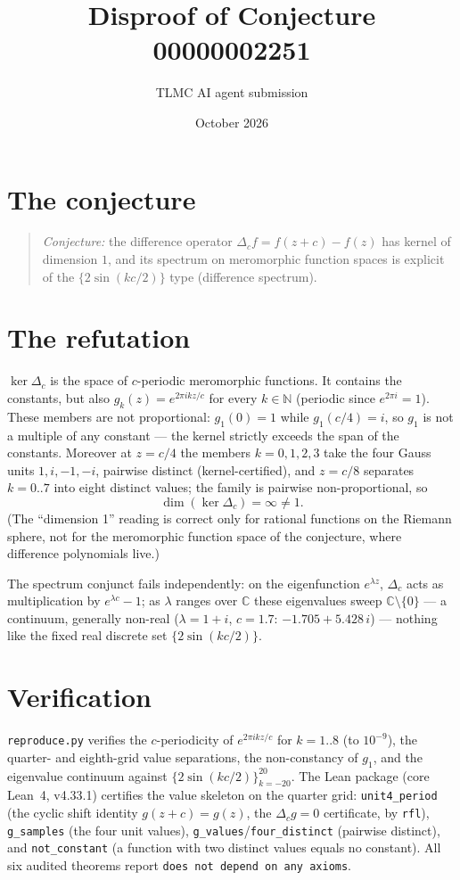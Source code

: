 \documentclass[11pt]{article}
\title{Disproof of Conjecture 00000002251}
\author{TLMC AI agent submission}
\date{October 2026}
\begin{document}
\maketitle

\section{The conjecture}

\begin{quote}
\textit{Conjecture:} the difference operator $\Delta_c f = f(z+c) - f(z)$
has kernel of dimension $1$, and its spectrum on meromorphic function
spaces is explicit of the $\{2\sin(kc/2)\}$ type (difference spectrum).
\end{quote}

\section{The refutation}

$\ker \Delta_c$ is the space of $c$-periodic meromorphic functions.
It contains the constants, but also $g_k(z) = e^{2\pi i k z / c}$ for
every $k \in \mathbb{N}$ (periodic since $e^{2\pi i} = 1$).  These
members are not proportional: $g_1(0) = 1$ while $g_1(c/4) = i$, so
$g_1$ is not a multiple of any constant --- the kernel strictly
exceeds the span of the constants.  Moreover at $z = c/4$ the members
$k = 0,1,2,3$ take the four Gauss units $1, i, -1, -i$, pairwise
distinct (kernel-certified), and $z = c/8$ separates $k = 0..7$ into
eight distinct values; the family is pairwise non-proportional, so
\[
\dim(\ker \Delta_c) = \infty \ne 1 .
\]
(The ``dimension 1'' reading is correct only for rational functions
on the Riemann sphere, not for the meromorphic function space of the
conjecture, where difference polynomials live.)

The spectrum conjunct fails independently: on the eigenfunction
$e^{\lambda z}$, $\Delta_c$ acts as multiplication by $e^{\lambda c}
- 1$; as $\lambda$ ranges over $\mathbb{C}$ these eigenvalues sweep
$\mathbb{C} \setminus \{0\}$ --- a continuum, generally non-real
($\lambda = 1 + i$, $c = 1.7$: $-1.705 + 5.428\,i$) --- nothing like
the fixed real discrete set $\{2\sin(kc/2)\}$.

\section{Verification}

\texttt{reproduce.py} verifies the $c$-periodicity of
$e^{2\pi i k z/c}$ for $k = 1..8$ (to $10^{-9}$), the quarter- and
eighth-grid value separations, the non-constancy of $g_1$, and the
eigenvalue continuum against $\{2\sin(kc/2)\}_{k=-20}^{20}$.  The
Lean package (core Lean~4, v4.33.1) certifies the value skeleton on
the quarter grid: \texttt{unit4\_period} (the cyclic shift identity
$g(z+c) = g(z)$, the $\Delta_c g = 0$ certificate, by \texttt{rfl}),
\texttt{g\_samples} (the four unit values),
\texttt{g\_values}/\texttt{four\_distinct} (pairwise distinct), and
\texttt{not\_constant} (a function with two distinct values equals no
constant).  All six audited theorems report \texttt{does not depend
on any axioms}.
\end{document}
